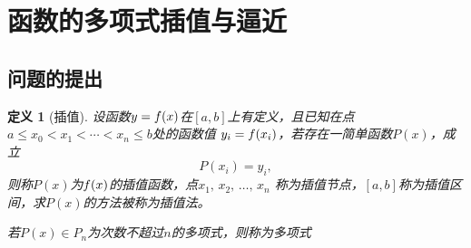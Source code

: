 \documentclass[12pt, a4paper]{article}
\theoremstyle{margin}
\newtheorem{defi}[thm]{定义}
\newcommand{\f}{\mathnormal{f}}
\newcommand{\vep}{\varepsilon}
\begin{document}
\newpage
\section{函数的多项式插值与逼近}
\subsection{问题的提出}
  \begin{defi}[插值]
    \label{defi: 插值}
    设函数$y = \f(x)$在$[a, b]$上有定义，且已知在点
    $a\le x_0 < x_1 < \cdots < x_n \le b$处的函数值
    $y_i = \f(x_i)$，若存在一简单函数$P(x)$，成立
    \[
      P(x_i) = y_i,
    \]
    则称$P(x)$为$\f(x)$的插值函数，点$x_1,\,x_2,\,\dots,\,x_n$
    称为插值节点，$[a, b]$称为插值区间，求$P(x)$的方法被称为插值法。\par
    若$P(x) \in P_n$为次数不超过$n$的多项式，则称为多项式
  \end{defi}

  \iffalse
    给定一个函数$y = y(x)$在$[a, b]$中的点$x_0<\cdots<x_n$相应的函数值
    $y(x_i)$，设法重构函数$y = y(x)$。\footnote{从系统论的观点出发，
    即：已知映射$K$的一系列输入输出对，如何重构该映射$K$。}\par
    一般情况下解不唯一。所以设$y = y(x)$位于某一函数内，此时可能存在唯一解。
    例如，设$y(x)\in P_n$，则只需知道$n+1$个点的函数值，即可有唯一解。
      或者设输出$y_i$有测量误差。
      \[
      \widetilde{y}_i = \f(x_i) + \vep_i
      \]
      其中$\vep_i$为误差。
      \[
      y = \f(x) + \vep
      \]
      其中$\vep$正态分布。根据极大似然估计，等价于最小二乘解，
      （输出最小二乘法）
      \[
      \min_{y\in\pi} \sum_{i=0}^n|y_i - y(x_i)|^2
      \]
      其中$\pi$为某一个函数，有两种情况，
      \begin{enumerate}
      \item $\pi$由物理或化学规律确定；（基于机理建模）
      \item $\pi$由数据决定。（基于数据建模）
      \end{enumerate}
      （求关于权重和阈值的优化问题）；（非线性最小二乘解）。

    \paragraph{系统论的观点}
  \fi
\end{document}
